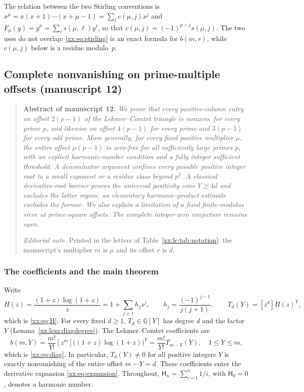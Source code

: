 \documentclass[11pt,a4paper]{article}
\numberwithin{equation}{section}
\theoremstyle{definition}
\theoremstyle{remark}
\theoremstyle{plain}
\newcommand{\Q}{\mathbb Q}
\newcommand{\coef}[2]{[#1^{#2}]}
\newcommand{\fall}[2]{#1^{\underline{#2}}}
\begin{document}
The relation between the two Stirling conventions is
$x^{\overline\mu}=x(x+1)\cdots(x+\mu-1)=\sum_jc(\mu,j)x^j$ and
$F_\mu(y)=\fall y\mu=\sum_\ell s(\mu,\ell)y^\ell$, so that
$c(\mu,j)=(-1)^{\mu-j}s(\mu,j)$.  The two uses do not overlap:
\eqref{xx:eq:stirling} is an exact formula for $b(m,r)$, while $c(\mu,j)$ below
is a residue modulo~$p$.

\subsection{Complete nonvanishing on prime-multiple offsets (manuscript 12)}\label{xx:pm:sec}

\begin{quote}\small
\textbf{Abstract of manuscript 12.}\itshape
We prove that every positive-column entry on offset $2(p-1)$ of the
Lehmer--Comtet triangle is nonzero, for every prime $p$, and likewise on offset
$4(p-1)$ for every prime and $3(p-1)$ for every odd prime. More generally, for
every fixed positive multiplier $\mu$, the entire offset $\mu(p-1)$ is
zero-free for all sufficiently large primes $p$, with an explicit
harmonic-number condition and a fully integer sufficient threshold. A
denominator argument confines every possible positive integer root to a small
exponent or a residue class beyond $p^2$. A classical derivative-root barrier
proves the universal positivity cone $Y\ge4d$ and excludes the latter region;
an elementary harmonic-product estimate excludes the former. We also explain a
limitation of a fixed finite-modulus sieve at prime-square offsets. The
complete integer-zero conjecture remains open.
\upshape\par
\smallskip
\emph{Editorial note.}  Printed in the letters of
Table~\ref{xx:lc:tab:notation}: the manuscript's multiplier $m$ is $\mu$ and its
offset $r$ is $d$.
\end{quote}

\subsubsection{The coefficients and the main theorem}

Write
\begin{equation}\label{xx:pm:H}
 H(z)=\frac{(1+z)\log(1+z)}z
 =1+\sum_{j\ge1}h_jz^j,\qquad
 h_j=\frac{(-1)^{j-1}}{j(j+1)},\qquad T_d(Y)=\coef{z}{d}H(z)^Y,
\end{equation}
which is \eqref{xx:eq:H}.  For every fixed $d\ge1$, $T_d\in\Q[Y]$ has degree
$d$ and the factor $Y$ (Lemma~\ref{xx:lem:diagdegree}).  The Lehmer--Comtet
coefficients are
\begin{equation}\label{xx:pm:b}
 b(m,Y)=\frac{m!}{Y!}\coef{z}{m}\bigl((1+z)\log(1+z)\bigr)^Y
 =\frac{m!}{Y!}T_{m-Y}(Y),\quad 1\le Y\le m,
\end{equation}
which is \eqref{xx:eq:diag}.  In particular, $T_d(Y)\ne0$ for all positive
integers $Y$ is exactly nonvanishing of the entire offset $m-Y=d$.  These
coefficients enter the derivative expansion \eqref{xx:eq:expansion}.
Throughout, $\mathsf H_n=\sum_{i=1}^n1/i$, with $\mathsf H_0=0$, denotes a
harmonic number.
\end{document}
